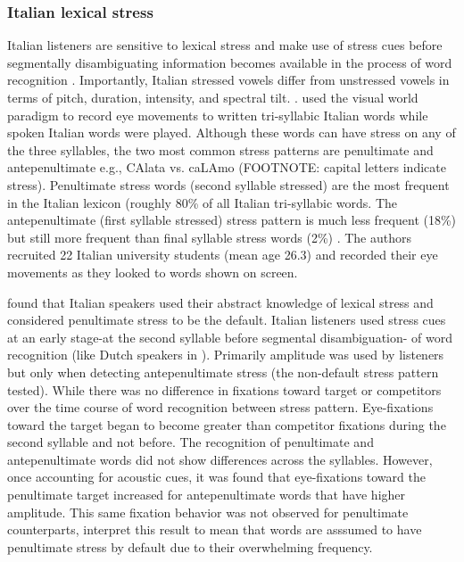 \subsubsection{Italian lexical stress}
Italian listeners are sensitive to lexical stress and make use of stress cues before segmentally disambiguating information becomes available in the process of word recognition \cite{Tagliapietra2005, Sulpizio_McQueen_2012}. Importantly, Italian stressed vowels differ from unstressed vowels in terms of pitch, duration, intensity, and spectral tilt. \citep{Maturi1998}. \cite{Sulpizio_McQueen_2012} used the visual world paradigm to record eye movements to written tri-syllabic Italian words while spoken Italian words were played. Although these words can have stress on any of the three syllables, the two most common stress patterns are penultimate and antepenultimate e.g., CAlata vs. caLAmo (FOOTNOTE: capital letters indicate stress). Penultimate stress words (second syllable stressed) are the most frequent in the Italian lexicon (roughly 80\% of all Italian tri-syllabic words. The antepenultimate (first syllable stressed) stress pattern is much less frequent (18\%) but still more frequent than final syllable stress words (2\%) \citep{thornton_1997}. The authors recruited 22 Italian university students (mean age 26.3) and recorded their eye movements as they looked to words shown on screen.

\cite{Sulpizio_McQueen_2012} found that Italian speakers used their abstract knowledge of lexical stress and considered penultimate stress to be the default. Italian listeners used stress cues at an early stage-at the second syllable before segmental disambiguation- of word recognition (like Dutch speakers in \cite{Reinisch2010}). Primarily amplitude was used by listeners but only when detecting antepenultimate stress (the non-default stress pattern tested). While there was no difference in fixations toward target or competitors over the time course of word recognition between stress pattern. Eye-fixations toward the target began to become greater than competitor fixations during the second syllable and not before. The recognition of penultimate and antepenultimate words did not show differences across the syllables. However, once accounting for acoustic cues, it was found that eye-fixations toward the penultimate target increased for antepenultimate words that have higher amplitude. This same fixation behavior was not observed for penultimate counterparts, \cite{Sulpizio_McQueen_2012} interpret this result to mean that words are asssumed to have penultimate stress by default due to their overwhelming frequency. 


